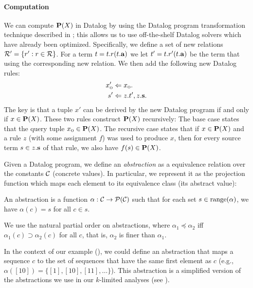 \paragraph{Computation}

We can compute $\mathbf{P}(X)$ in Datalog by using the Datalog program transformation technique described in 
\cite{liang11minimal}; this allows us to use off-the-shelf Datalog solvers which have already been optimized.
Specifically, we define a set of new relations $\mathcal{R}' = \{ r' : r \in \mathcal{R} \}$.
For a term $t = t.r(t.\mathbf{a})$ we let $t' = t.r'(t.\mathbf{a})$ be the term that using the corresponding new relation.
We then add the following new Datalog rules:
\begin{align}
x_\text{\sc o}' &\Leftarrow x_\text{\sc o}. \label{eqn:revBase} \\
s'   &\Leftarrow z.t', z.\mathbf{s}. \label{eqn:indBase}
\end{align}
The key is that a tuple $x'$ can be derived by the new Datalog program if and only if $x \in \mathbf{P}(X)$.
These two rules construct $\mathbf{P}(X)$ recursively:
The base case  states that the query tuple $x_\text{\sc o} \in \mathbf{P}(X)$.
The recursive case  states that if $x \in \mathbf{P}(X)$ and a rule $z$ (with some assignment $f$)
was used to produce $x$, then for every source term $s \in z.\mathbf{s}$ of that rule,
we also have $f(s) \in \mathbf{P}(X)$.


Given a Datalog program, we define an {\em abstraction} as a equivalence relation over
the constants $\mathcal{C}$ (concrete values).  In particular, we represent it as the projection
function which maps each element to its equivalence class (its abstract value):
\begin{definition}
\label{def:abstraction}
An abstraction is a function $\alpha : \mathcal{C} \to \mathcal{P}(\mathcal{C})$
such that for each set $s \in \text{range}(\alpha)$,
we have $\alpha(c) = s$ for all $c \in s$.
\end{definition}
We use the natural partial order on abstractions,
where $\alpha_1 \preceq \alpha_2$ iff $\alpha_1(c) \supset \alpha_2(c)$ for all $c$,
that is, $\alpha_2$ is finer than $\alpha_1$.

In the context of our example (),
we could define an abstraction
that maps a sequence $c$ to the set of sequences that have the same first element as $c$
(e.g., $\alpha([10]) = \{ [1], [10], [11], \dots \}$).
This abstraction is a simplified version of the abstractions we use in our
$k$-limited analyses (see ).


